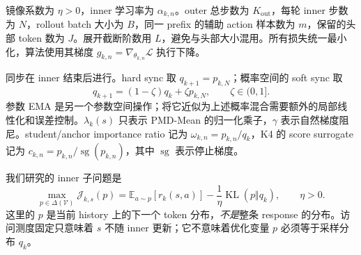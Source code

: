\documentclass[lang=cn,scheme=chinese,openany]{../book/elegantbook}
\newcommand{\E}{\mathbb E}
\newcommand{\KL}{\operatorname{KL}}
\begin{document}
镜像系数为 $\eta>0$，inner 学习率为 $\alpha_{k,n}$。outer 总步数为 $K_{\mathrm{out}}$，每轮 inner 步数为 $N$，rollout batch 大小为 $B$，同一 prefix 的辅助 action 样本数为 $m$，保留的头部 token 数为 $J$。展开截断阶数用 $L$，避免与头部大小混用。所有损失统一最小化，算法使用其梯度 $g_{k,n}=\nabla_{\theta_{k,n}}\mathcal L$ 执行下降。

同步在 inner 结束后进行。hard sync 取 $ q_{k+1}= p_{k,N}$；概率空间的 soft sync 取
\begin{equation}
q_{k+1}=(1-\zeta) q_k+\zeta p_{k,N},\qquad\zeta\in(0,1].
\end{equation}
参数 EMA 是另一个参数空间操作；将它近似为上述概率混合需要额外的局部线性化和误差控制。$\lambda_k(s)$ 只表示 PMD-Mean 的归一化乘子，$\gamma$ 表示自然梯度阻尼。student/anchor importance ratio 记为 $\omega_{k,n}= p_{k,n}/ q_k$，K4 的 score surrogate 记为 $c_{k,n}= p_{k,n}/\operatorname{sg}( p_{k,n})$，其中 $\operatorname{sg}$ 表示停止梯度。

我们研究的 inner 子问题是
\begin{equation}\label{eq:common-objective}
 \max_{p\in\Delta(\mathcal V)}
 \mathcal J_{k,s}(p)
 =\E_{a\sim p}[r_k(s,a)]-
 \frac{1}{\eta}\KL(p\Vert q_k),
 \qquad \eta>0.
\end{equation}
这里的 $p$ 是当前 history 上的下一个 token 分布，\emph{不是}整条 response 的分布。访问测度固定只意味着 $s$ 不随 inner 更新；它不意味着优化变量 $p$ 必须等于采样分布 $ q_k$。



\end{document}
